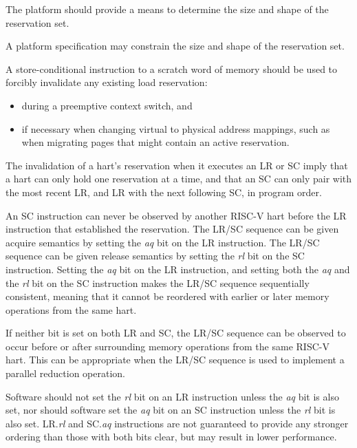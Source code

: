 \begin{commentary}
The platform should provide a means to determine the size and shape of the
reservation set.

A platform specification may constrain the size and shape of the reservation
set.
\end{commentary}

\begin{commentary}
A store-conditional instruction to a scratch word of memory should be used
to forcibly invalidate any existing load reservation:
\begin{itemize}
\item during a preemptive context switch, and
\item if necessary when changing virtual to physical address mappings,
  such as when migrating pages that might contain an active reservation.
\end{itemize}
\end{commentary}

\begin{commentary}
The invalidation of a hart's reservation when it executes an LR or SC
imply that a hart can only hold one reservation at a time, and that
an SC can only pair with the most recent LR, and LR with the next
following SC, in program order.
\end{commentary}

An SC instruction can never be observed by another RISC-V hart
before the LR instruction that established the reservation.
The LR/SC
sequence can be given acquire semantics by setting the {\em aq} bit on
the LR instruction.  The LR/SC sequence can be given release semantics
by setting the {\em rl} bit on the SC instruction.  Setting the {\em
  aq} bit on the LR instruction, and setting both the {\em aq} and the {\em
  rl} bit on the SC instruction makes the LR/SC sequence sequentially
consistent, meaning that it cannot be reordered with earlier or
later memory operations from the same hart.

If neither bit is set on both LR and SC, the LR/SC sequence can be
observed to occur before or after surrounding memory operations from
the same RISC-V hart.  This can be appropriate when the LR/SC
sequence is used to implement a parallel reduction operation.

Software should not set the {\em rl} bit on an LR instruction unless the {\em
aq} bit is also set, nor should software set the {\em aq} bit on an SC
instruction unless the {\em rl} bit is also set.  LR.{\em rl} and SC.{\em aq}
instructions are not guaranteed to provide any stronger ordering than those
with both bits clear, but may result in lower performance.

